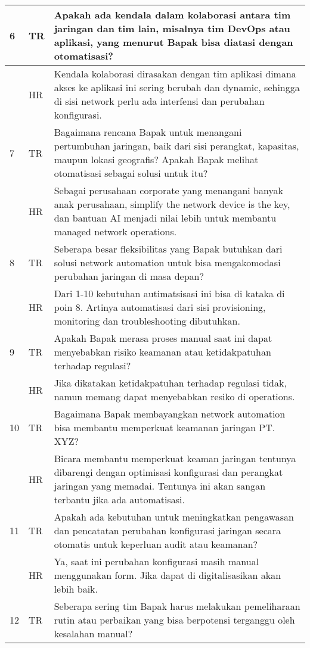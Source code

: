 \begin{longtable}{|p{1cm}|p{1.5cm}|p{11cm}|}
    \hline
    6 & TR & Apakah ada kendala dalam kolaborasi antara tim jaringan dan tim lain, misalnya tim DevOps atau aplikasi, yang menurut Bapak bisa diatasi dengan otomatisasi? \\
    \hline
    & HR & Kendala kolaborasi dirasakan dengan tim aplikasi dimana akses ke aplikasi ini sering berubah dan dynamic, sehingga di sisi network perlu ada interfensi dan perubahan konfigurasi. \\
    \hline
    7 & TR & Bagaimana rencana Bapak untuk menangani pertumbuhan jaringan, baik dari sisi perangkat, kapasitas, maupun lokasi geografis? Apakah Bapak melihat otomatisasi sebagai solusi untuk itu? \\
    \hline
    & HR & Sebagai perusahaan corporate yang menangani banyak anak perusahaan, simplify the network device is the key, dan bantuan AI menjadi nilai lebih untuk membantu managed network operations. \\
    \hline
    8 & TR & Seberapa besar fleksibilitas yang Bapak butuhkan dari solusi network automation untuk bisa mengakomodasi perubahan jaringan di masa depan? \\
    \hline
    & HR & Dari 1-10 kebutuhan autimatsisasi ini bisa di kataka di poin 8. Artinya automatisasi dari sisi provisioning, monitoring dan troubleshooting dibutuhkan. \\
    \hline
    9 & TR & Apakah Bapak merasa proses manual saat ini dapat menyebabkan risiko keamanan atau ketidakpatuhan terhadap regulasi? \\
    \hline
    & HR & Jika dikatakan ketidakpatuhan terhadap regulasi tidak, namun memang dapat menyebabkan resiko di operations. \\
    \hline
    10 & TR & Bagaimana Bapak membayangkan network automation bisa membantu memperkuat keamanan jaringan PT. XYZ? \\
    \hline
    & HR & Bicara membantu memperkuat keaman jaringan tentunya dibarengi dengan optimisasi konfigurasi dan perangkat jaringan yang memadai. Tentunya ini akan sangan terbantu jika ada automatisasi. \\
    \hline
    11 & TR & Apakah ada kebutuhan untuk meningkatkan pengawasan dan pencatatan perubahan konfigurasi jaringan secara otomatis untuk keperluan audit atau keamanan? \\
    \hline
    & HR & Ya, saat ini perubahan konfigurasi masih manual menggunakan form. Jika dapat di digitalisasikan akan lebih baik. \\
    \hline
    12 & TR & Seberapa sering tim Bapak harus melakukan pemeliharaan rutin atau perbaikan yang bisa berpotensi terganggu oleh kesalahan manual? \\

\end{longtable}
